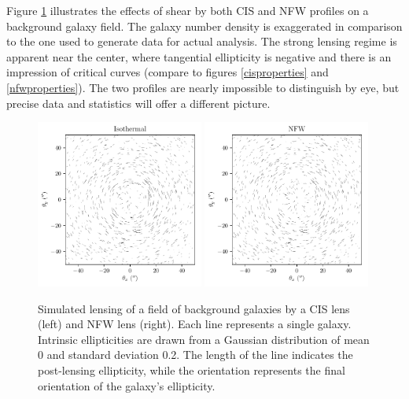 \documentclass[10pt]{article}
\begin{document}
Figure \ref{ellipticityexample} illustrates the effects of shear by both CIS and NFW profiles on a background galaxy field. The galaxy number density is exaggerated in comparison to the one used to generate data for actual analysis. The strong lensing regime is apparent near the center, where tangential ellipticity is negative and there is an impression of critical curves (compare to figures \ref{cisproperties} and \ref{nfwproperties}). The two profiles are nearly impossible to distinguish by eye, but precise data and statistics will offer a different picture.

\begin{figure}
    \centering
    \includegraphics[width=0.49\textwidth]{isothermalellipticities.pdf}
    \includegraphics[width=0.49\textwidth]{nfwellipticities.pdf}
    \caption{Simulated lensing of a field of background galaxies by a CIS lens (left) and NFW lens (right). Each line represents a single galaxy. Intrinsic ellipticities are drawn from a Gaussian distribution of mean 0 and standard deviation 0.2. The length of the line indicates the post-lensing ellipticity, while the orientation represents the final orientation of the galaxy's ellipticity.}
    \label{ellipticityexample}
\end{figure}
\end{document}
